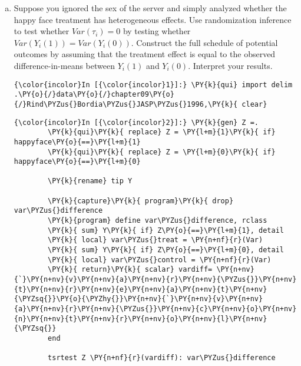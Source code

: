 \documentclass[11pt,notitlepage]{article}\usepackage[]{graphicx}\usepackage[]{color}
\makeatletter
\newenvironment{kframe}{%
 \def\at@end@of@kframe{}%
 \ifinner\ifhmode%
  \def\at@end@of@kframe{\end{minipage}}%
  \begin{minipage}{\columnwidth}%
 \fi\fi%
 \def\FrameCommand##1{\hskip\@totalleftmargin \hskip-\fboxsep
 \colorbox{shadecolor}{##1}\hskip-\fboxsep
     \hskip-\linewidth \hskip-\@totalleftmargin \hskip\columnwidth}%
 \MakeFramed {\advance\hsize-\width
   \@totalleftmargin\z@ \linewidth\hsize
   \@setminipage}}%
 {\par\unskip\endMakeFramed%
 \at@end@of@kframe}
\newenvironment{knitrout}{}{} %
\makeatother
\begin{document}
\begin{enumerate}[a)]
\item Suppose you ignored the sex of the server and simply analyzed whether the happy face treatment has heterogeneous effects. Use randomization inference to test whether $Var(\tau_i) = 0$ by testing whether $Var(Y_i(1)) = Var(Y_i(0))$. Construct the full schedule of potential outcomes by assuming that the treatment effect is equal to the observed difference-in-means between $Y_i(1)$ and $Y_i(0)$. Interpret your results.\\

\begin{knitrout}
\color{fgcolor}\begin{kframe}

    \begin{Verbatim}[commandchars=\\\{\}]
{\color{incolor}In [{\color{incolor}1}]:} \PY{k}{qui} import delim .\PY{o}{/}data\PY{o}{/}chapter09\PY{o}{/}Rind\PYZus{}Bordia\PYZus{}JASP\PYZus{}1996,\PY{k}{ clear}
\end{Verbatim}

    \begin{Verbatim}[commandchars=\\\{\}]
{\color{incolor}In [{\color{incolor}2}]:} \PY{k}{gen} Z =.
        \PY{k}{qui}\PY{k}{ replace} Z = \PY{l+m}{1}\PY{k}{ if} happyface\PY{o}{==}\PY{l+m}{1}
        \PY{k}{qui}\PY{k}{ replace} Z = \PY{l+m}{0}\PY{k}{ if} happyface\PY{o}{==}\PY{l+m}{0}
        
        \PY{k}{rename} tip Y
        
        \PY{k}{capture}\PY{k}{ program}\PY{k}{ drop} var\PYZus{}difference
        \PY{k}{program} define var\PYZus{}difference, rclass
        \PY{k}{	sum} Y\PY{k}{ if} Z\PY{o}{==}\PY{l+m}{1}, detail
        \PY{k}{	local} var\PYZus{}treat = \PY{n+nf}{r}(Var)
        \PY{k}{	sum} Y\PY{k}{ if} Z\PY{o}{==}\PY{l+m}{0}, detail
        \PY{k}{	local} var\PYZus{}control = \PY{n+nf}{r}(Var)
        \PY{k}{	return}\PY{k}{ scalar} vardiff= \PY{n+nv}{`}\PY{n+nv}{v}\PY{n+nv}{a}\PY{n+nv}{r}\PY{n+nv}{\PYZus{}}\PY{n+nv}{t}\PY{n+nv}{r}\PY{n+nv}{e}\PY{n+nv}{a}\PY{n+nv}{t}\PY{n+nv}{\PYZsq{}}\PY{o}{\PYZhy{}}\PY{n+nv}{`}\PY{n+nv}{v}\PY{n+nv}{a}\PY{n+nv}{r}\PY{n+nv}{\PYZus{}}\PY{n+nv}{c}\PY{n+nv}{o}\PY{n+nv}{n}\PY{n+nv}{t}\PY{n+nv}{r}\PY{n+nv}{o}\PY{n+nv}{l}\PY{n+nv}{\PYZsq{}}
        end
        
        tsrtest Z \PY{n+nf}{r}(vardiff): var\PYZus{}difference
\end{Verbatim}


\end{kframe}
\end{knitrout}
\end{enumerate}
\end{document}
